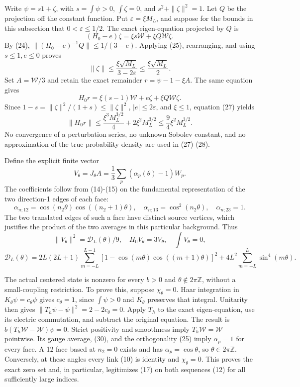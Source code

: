 \documentclass[
  11pt,
]{article}
\begin{document}
Write \(\psi=s1+\zeta\), with \(s=\int\psi>0\), \(\int\zeta=0\), and
\(s^2+\|\zeta\|^2=1\). Let \(Q\) be the projection off the constant
function. Put \(\varepsilon=\xi M_L\), and suppose for the bounds in
this subsection that \(0<\varepsilon\le1/2\). The exact eigen-equation
projected by \(Q\) is \[
 (H_0-e)\zeta=\xi s\mathcal W+\xi Q\mathcal W\zeta.
\] By (24), \(\|(H_0-e)^{-1}Q\|\le1/(3-e)\). Applying (25), rearranging,
and using \(s\le1,e\le0\) proves \[
 \|\zeta\|\le\frac{\xi\sqrt{M_L}}{3-2\varepsilon}
 \le\frac{\xi\sqrt{M_L}}2.
\tag{27}
\] Set \(A=\mathcal W/3\) and retain the exact remainder
\(r=\psi-1-\xi A\). The same equation gives \[
 H_0r=\xi(s-1)\mathcal W+e\zeta+\xi Q\mathcal W\zeta.
\] Since \(1-s=\|\zeta\|^2/(1+s)\le\|\zeta\|^2\),
\(|e|\le2\varepsilon\), and \(\xi\le1\), equation (27) yields \[
 \boxed{\quad\|H_0r\|\le
 \frac{\xi^3M_L^{3/2}}4+2\xi^2M_L^{3/2}
 \le\frac94\xi^2M_L^{3/2}.\quad}
\tag{28}
\] No convergence of a perturbation series, no unknown Sobolev constant,
and no approximation of the true probability density are used in
(27)-(28).

Define the explicit finite vector \[
 V_\theta=J_\theta A=\frac13\sum_p(\alpha_p(\theta)-1)W_p.
\tag{29}
\] The coefficients follow from (14)-(15) on the fundamental
representation of the two direction-1 edges of each face: \[
 \alpha_{n;12}=\cos(n_2\theta)\cos((n_2+1)\theta),\quad
 \alpha_{n;13}=\cos^2(n_2\theta),\quad\alpha_{n;23}=1.
\tag{30}
\] The two translated edges of such a face have distinct source
vertices, which justifies the product of the two averages in this
particular background. Thus \[
 \|V_\theta\|^2=\mathcal D_L(\theta)/9,\quad
 H_0V_\theta=3V_\theta,\quad\int V_\theta=0,
\] \[
 \mathcal D_L(\theta)=2L(2L+1)\sum_{m=-L}^{L-1}
 [1-\cos(m\theta)\cos((m+1)\theta)]^2
 +4L^2\sum_{m=-L}^{L}\sin^4(m\theta).
\tag{31}
\]

The actual centered state is nonzero for every \(b>0\) and
\(\theta\notin2\pi\mathbb Z\), without a small-coupling restriction. To
prove this, suppose \(\chi_\theta=0\). Haar integration in
\(K_\theta\psi=c_\theta\psi\) gives \(c_\theta=1\), since \(\int\psi>0\)
and \(K_\theta\) preserves that integral. Unitarity then gives
\(\|T_h\psi-\psi\|^2=2-2c_\theta=0\). Apply \(T_h\) to the exact
eigen-equation, use its electric commutation, and subtract the original
equation. The result is \(b(T_h\mathcal W-\mathcal W)\psi=0\). Strict
positivity and smoothness imply \(T_h\mathcal W=\mathcal W\) pointwise.
Its gauge average, (30), and the orthogonality (25) imply \(\alpha_p=1\)
for every face. A 12 face based at \(n_2=0\) exists and has
\(\alpha_p=\cos\theta\), so \(\theta\in2\pi\mathbb Z\). Conversely, at
these angles every link (10) is identity and \(\chi_\theta=0\). This
proves the exact zero set and, in particular, legitimizes (17) on both
sequences (12) for all sufficiently large indices.
\end{document}
